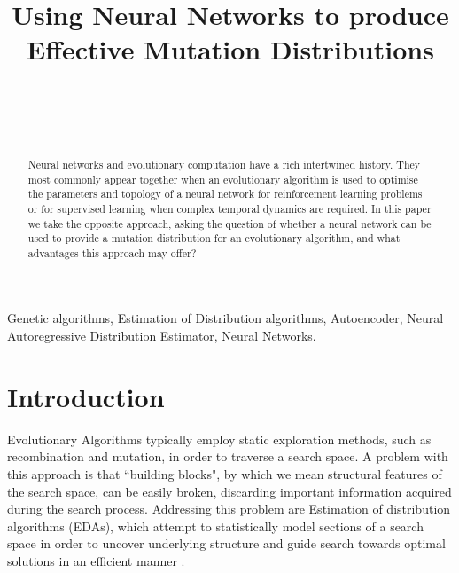 \documentclass[twoside]{article}
\begin{document}
\title{\bf Using Neural Networks to produce Effective Mutation Distributions}  

\author{ \hfill {}\\ 
\AND
        \hfill {}\\
\AND
        \hfill {}\\
}

\maketitle

\begin{abstract}

Neural networks and evolutionary computation have a rich intertwined history. They most commonly appear together when an evolutionary algorithm is used to optimise the parameters and topology of a neural network for reinforcement learning problems or for supervised learning when complex temporal dynamics are required. In this paper we take the opposite approach, asking the question of whether a neural network can be used to provide a mutation distribution for an evolutionary algorithm, and what advantages this approach may offer? 

\end{abstract}

\begin{keywords}

Genetic algorithms, 
Estimation of Distribution algorithms,
Autoencoder,
Neural Autoregressive Distribution Estimator,
Neural Networks.

\end{keywords}
\section{Introduction}
Evolutionary Algorithms typically employ static exploration methods, such as recombination and mutation, in order to traverse a search space. A problem with this approach is that ``building blocks", by which we mean structural features of the search space, can be easily broken, discarding important information acquired during the search process. Addressing this problem are Estimation of distribution algorithms (EDAs), which attempt to statistically model sections of a search space in order to uncover underlying structure and guide search towards optimal solutions in an efficient manner \cite{pelikan2006scalable}.
\end{document}
